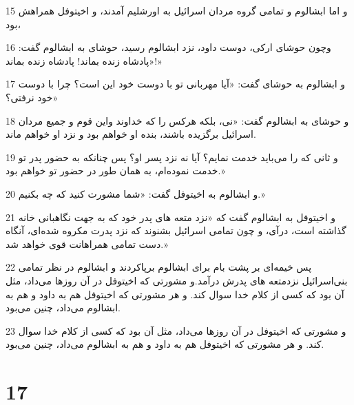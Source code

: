 \par 15 و اما ابشالوم و تمامی گروه مردان اسرائیل به اورشلیم آمدند، و اخیتوفل همراهش بود،
\par 16 وچون حوشای ارکی، دوست داود، نزد ابشالوم رسید، حوشای به ابشالوم گفت: «پادشاه زنده بماند! پادشاه زنده بماند!»
\par 17 و ابشالوم به حوشای گفت: «آیا مهربانی تو با دوست خود این است؟ چرا با دوست خود نرفتی؟»
\par 18 و حوشای به ابشالوم گفت: «نی، بلکه هرکس را که خداوند واین قوم و جمیع مردان اسرائیل برگزیده باشند، بنده او خواهم بود و نزد او خواهم ماند.
\par 19 و ثانی که را می‌باید خدمت نمایم؟ آیا نه نزد پسر او؟ پس چنانکه به حضور پدر تو خدمت نموده‌ام، به همان طور در حضور تو خواهم بود.»
\par 20 و ابشالوم به اخیتوفل گفت: «شما مشورت کنید که چه بکنیم.»
\par 21 و اخیتوفل به ابشالوم گفت که «نزد متعه های پدر خود که به جهت نگاهبانی خانه گذاشته است، درآی، و چون تمامی اسرائیل بشنوند که نزد پدرت مکروه شده‌ای، آنگاه دست تمامی همراهانت قوی خواهد شد.»
\par 22 پس خیمه‌ای بر پشت بام برای ابشالوم برپاکردند و ابشالوم در نظر تمامی بنی‌اسرائیل نزدمتعه های پدرش درآمد.و مشورتی که اخیتوفل در آن روزها می‌داد، مثل آن بود که کسی از کلام خدا سوال کند. و هر مشورتی که اخیتوفل هم به داود و هم به ابشالوم می‌داد، چنین می‌بود.
\par 23 و مشورتی که اخیتوفل در آن روزها می‌داد، مثل آن بود که کسی از کلام خدا سوال کند. و هر مشورتی که اخیتوفل هم به داود و هم به ابشالوم می‌داد، چنین می‌بود.
 
\chapter{17}

